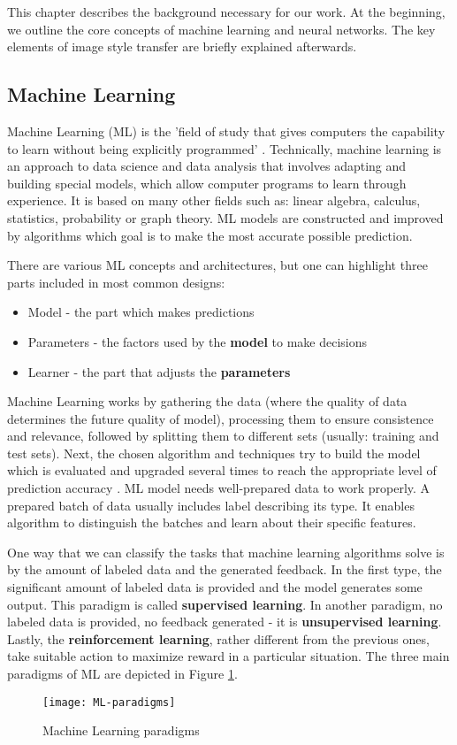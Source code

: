 \documentclass[../Main.tex]{subfiles}
\begin{document}
    This chapter describes the background necessary for our work. At the beginning, we outline the core concepts of machine learning and neural networks. The key elements of image style transfer are briefly explained afterwards.

\subsection{Machine Learning} 
    Machine Learning (ML) is the 'field of study that gives computers the capability to learn without being explicitly programmed' \cite{Samuel1959SomeSI}. Technically, machine learning is an approach to data science and data analysis that involves adapting and building special models, which allow computer programs to learn through experience. It is based on many other fields such as: linear algebra, calculus, statistics, probability or graph theory. ML models are constructed and improved by algorithms which goal is to make the most accurate possible prediction.
    
    There are various ML concepts and architectures, but one can highlight three parts included in most common designs:
    \begin{itemize}
        \item Model - the part which makes predictions
        \item Parameters - the factors used by the \textbf{model} to make decisions
        \item Learner - the part that adjusts the \textbf{parameters}
    \end{itemize}
    Machine Learning works by gathering the data (where the quality of data determines the future quality of model), processing them to ensure consistence and relevance, followed by splitting them to different sets (usually: training and test sets). Next, the chosen algorithm and techniques try to build the model which is evaluated and upgraded several times to reach the appropriate level of prediction accuracy \cite{deepai}. ML model needs well-prepared data to work properly. A prepared batch of data usually includes label describing its type. It enables algorithm to distinguish the batches and learn about their specific features. 

    One way that we can classify the tasks that machine learning algorithms solve is by the amount of labeled data and the generated feedback. In the first type, the significant amount of labeled data is provided and the model generates some output. This paradigm is called \textbf{supervised learning}. In another paradigm, no labeled data is provided, no feedback generated - it is  \textbf{unsupervised learning}. Lastly, the \textbf{reinforcement learning}, rather different from the previous ones, take suitable action to maximize reward in a particular situation. The three main paradigms of ML are depicted in Figure \ref{fig:ML-paradigms}. \\
    \begin{figure}[ht]
        \centering
        \texttt{[image: ML-paradigms]}
        \caption{Machine Learning paradigms}
        \label{fig:ML-paradigms}
    \end{figure}
\end{document}
